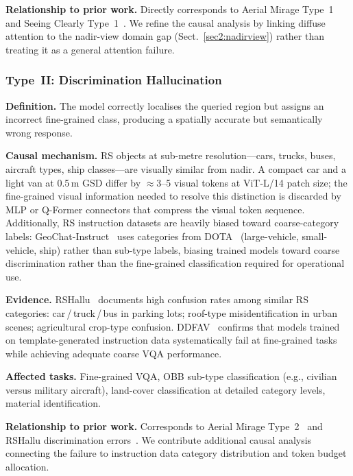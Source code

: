 \textbf{Relationship to prior work.}
Directly corresponds to Aerial Mirage Type~1~\cite{aerialmirage2026} and
Seeing Clearly Type~1~\cite{seeingclearly2026}. We refine the causal
analysis by linking diffuse attention to the nadir-view domain gap
(Sect.~\ref{sec2:nadirview}) rather than treating it as a general attention
failure.

\subsubsection{Type~II: Discrimination Hallucination}\label{sec7:type2}

\textbf{Definition.}
The model correctly localises the queried region but assigns an incorrect
fine-grained class, producing a spatially accurate but semantically wrong
response.

\textbf{Causal mechanism.}
RS objects at sub-metre resolution---cars, trucks, buses, aircraft types,
ship classes---are visually similar from nadir. A compact car and a
light van at 0.5\,m GSD differ by $\approx\!3$--5 visual tokens at
ViT-L/14 patch size; the fine-grained visual information needed to resolve
this distinction is discarded by MLP or Q-Former connectors that compress
the visual token sequence. Additionally, RS instruction datasets are
heavily biased toward coarse-category labels: GeoChat-Instruct~\cite{geochat2024}
uses categories from DOTA~\cite{xia2018dota} (large-vehicle, small-vehicle,
ship) rather than sub-type labels, biasing trained models toward coarse
discrimination rather than the fine-grained classification required for
operational use.

\textbf{Evidence.}
RSHallu~\cite{rshallu2026} documents high confusion rates among similar
RS categories: car\,/\,truck\,/\,bus in parking lots; roof-type
misidentification in urban scenes; agricultural crop-type confusion.
DDFAV~\cite{ddfav2025} confirms that models trained on template-generated
instruction data systematically fail at fine-grained tasks while achieving
adequate coarse VQA performance.

\textbf{Affected tasks.}
Fine-grained VQA, OBB sub-type classification (e.g., civilian versus
military aircraft), land-cover classification at detailed category levels,
material identification.

\textbf{Relationship to prior work.}
Corresponds to Aerial Mirage Type~2~\cite{aerialmirage2026} and RSHallu
discrimination errors~\cite{rshallu2026}. We contribute additional causal
analysis connecting the failure to instruction data category distribution
and token budget allocation.

